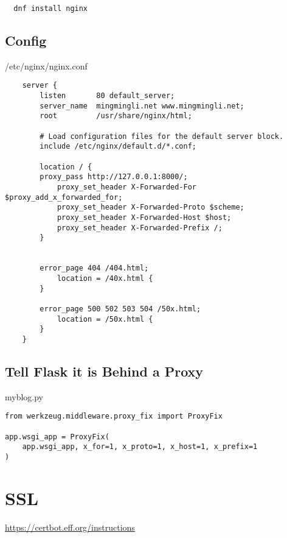 \begin{lstlisting}
  dnf install nginx
\end{lstlisting}

\subsection{Config}
\label{sec:config}

/etc/nginx/nginx.conf

\begin{lstlisting}
    server {
        listen       80 default_server;
        server_name  mingmingli.net www.mingmingli.net;
        root         /usr/share/nginx/html;

        # Load configuration files for the default server block.
        include /etc/nginx/default.d/*.conf;

        location / {
	    proxy_pass http://127.0.0.1:8000/;
            proxy_set_header X-Forwarded-For $proxy_add_x_forwarded_for;
            proxy_set_header X-Forwarded-Proto $scheme;
            proxy_set_header X-Forwarded-Host $host;
            proxy_set_header X-Forwarded-Prefix /;
        }


        error_page 404 /404.html;
            location = /40x.html {
        }

        error_page 500 502 503 504 /50x.html;
            location = /50x.html {
        }
    }  
\end{lstlisting}



\subsection{Tell Flask it is Behind a Proxy}

myblog.py
\begin{lstlisting}
from werkzeug.middleware.proxy_fix import ProxyFix

app.wsgi_app = ProxyFix(
    app.wsgi_app, x_for=1, x_proto=1, x_host=1, x_prefix=1
)  
\end{lstlisting}


\section{SSL}
\label{sec:ssl}

\url{https://certbot.eff.org/instructions}


